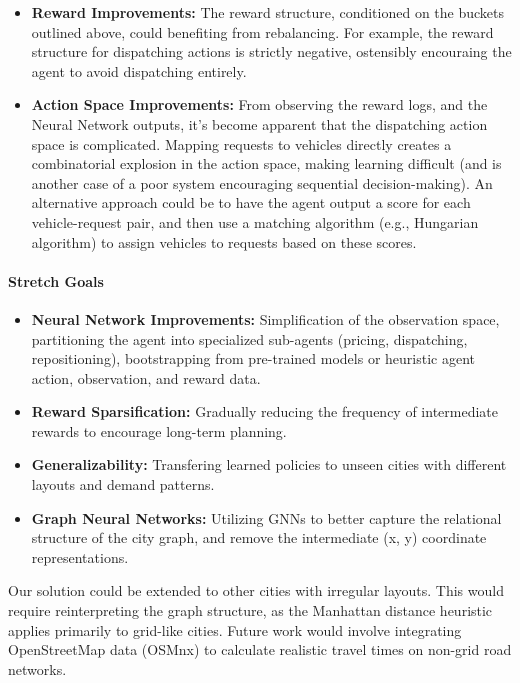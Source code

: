 \documentclass[11pt]{article}
\begin{document}
\begin{itemize}
				Finaly, categorical variables (e.g., weather state) could be represented as learned embeddings instead of
				one-hot encodings, allowing the model to learn relationships between categories.
		\item \textbf{Reward Improvements:} The reward structure, conditioned on the buckets outlined above, could
				benefiting from rebalancing. For example, the reward structure for dispatching actions is strictly
				negative, ostensibly encouraing the agent to avoid dispatching entirely.
		\item \textbf{Action Space Improvements:} From observing the reward logs, and the Neural Network outputs,
				it's become apparent that the dispatching action space is complicated. Mapping requests to vehicles
				directly creates a combinatorial explosion in the action space, making learning difficult (and is another
				case of a poor system encouraging sequential decision-making). An alternative approach could be to have
				the agent output a score for each vehicle-request pair, and then use a matching algorithm (e.g.,
				Hungarian algorithm) to assign vehicles to requests based on these scores.
\end{itemize}

\paragraph{Stretch Goals}
\begin{itemize}
		\item \textbf{Neural Network Improvements:} Simplification of the observation space, partitioning the agent
				into specialized sub-agents (pricing, dispatching, repositioning), bootstrapping from pre-trained models
				or heuristic agent action, observation, and reward data.
		\item \textbf{Reward Sparsification:} Gradually reducing the frequency of intermediate rewards to encourage
				long-term planning.
		\item \textbf{Generalizability:} Transfering learned policies to unseen cities with different layouts and
				demand patterns.
		\item \textbf{Graph Neural Networks:} Utilizing GNNs to better capture the relational structure of the city
				graph, and remove the intermediate (x, y) coordinate representations.
\end{itemize}

Our solution could be extended to other cities with irregular layouts. This would require reinterpreting the
graph structure, as the Manhattan distance heuristic applies primarily to grid-like cities. Future work would
involve integrating OpenStreetMap data (OSMnx) to calculate realistic travel times on non-grid road networks.

\printbibliography
\end{document}

